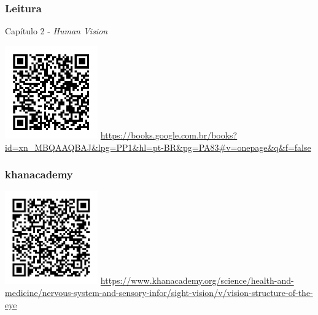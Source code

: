 \begin{frame}%
  \frametitle{Leitura}

  Capítulo 2 - \textit{Human Vision}

  \centering
  \includegraphics[width=0.3\textwidth]{images/qrcode-cap2-russ.pdf}
  \url{https://books.google.com.br/books?id=xn_MBQAAQBAJ\&lpg=PP1\&hl=pt-BR\&pg=PA83\#v=onepage\&q\&f=false}

\end{frame}

\begin{frame}%
  \frametitle{khanacademy}
  
  \centering
  \includegraphics[width=0.3\textwidth]{images/qrcode-khanacademy-eye.pdf}
  \url{https://www.khanacademy.org/science/health-and-medicine/nervous-system-and-sensory-infor/sight-vision/v/vision-structure-of-the-eye}
\end{frame}

